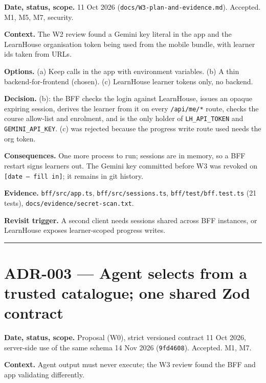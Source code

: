 \documentclass[
  11pt,
]{article}
\begin{document}
\textbf{Date, status, scope.} 11 Oct 2026
(\texttt{docs/W3-plan-and-evidence.md}). Accepted. M1, M5, M7, security.

\textbf{Context.} The W2 review found a Gemini key literal in the app
and the LearnHouse organisation token being used from the mobile bundle,
with learner ids taken from URLs.

\textbf{Options.} (a) Keep calls in the app with environment variables.
(b) A thin backend-for-frontend (chosen). (c) LearnHouse learner tokens
only, no backend.

\textbf{Decision.} (b): the BFF checks the login against LearnHouse,
issues an opaque expiring session, derives the learner from it on every
\texttt{/api/me/*} route, checks the course allow-list and enrolment,
and is the only holder of \texttt{LH\_API\_TOKEN} and
\texttt{GEMINI\_API\_KEY}. (c) was rejected because the progress write
route used needs the org token.

\textbf{Consequences.} One more process to run; sessions are in memory,
so a BFF restart signs learners out. The Gemini key committed before W3
was revoked on \texttt{{[}date\ —\ fill\ in{]}}; it remains in git
history.

\textbf{Evidence.} \texttt{bff/src/app.ts},
\texttt{bff/src/sessions.ts}, \texttt{bff/test/bff.test.ts} (21 tests),
\texttt{docs/evidence/secret-scan.txt}.

\textbf{Revisit trigger.} A second client needs sessions shared across
BFF instances, or LearnHouse exposes learner-scoped progress writes.

\begin{center}\rule{0.5\linewidth}{0.5pt}\end{center}

\hypertarget{adr-003-agent-selects-from-a-trusted-catalogue-one-shared-zod-contract}{%
\section{ADR-003 --- Agent selects from a trusted catalogue; one shared
Zod
contract}\label{adr-003-agent-selects-from-a-trusted-catalogue-one-shared-zod-contract}}

\textbf{Date, status, scope.} Proposal (W0), strict versioned contract
11 Oct 2026, server-side use of the same schema 14 Nov 2026
(\texttt{9fd4608}). Accepted. M1, M7.

\textbf{Context.} Agent output must never execute; the W3 review found
the BFF and app validating differently.
\end{document}
